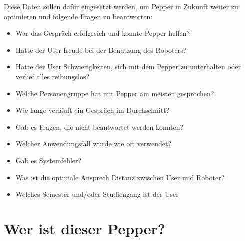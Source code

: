 Diese Daten sollen dafür eingesetzt werden, um Pepper in Zukunft weiter zu optimieren und folgende Fragen zu beantworten:
\begin{itemize}
    \item War das Gespräch erfolgreich und konnte Pepper helfen?
    \item Hatte der User freude bei der Benutzung des Roboters?
    \item Hatte der User Schwierigkeiten, sich mit dem Pepper zu unterhalten oder verlief alles reibungslos?
    \item Welche Personengruppe hat mit Pepper am meisten gesprochen?
    \item Wie lange verläuft ein Gespräch im Durchschnitt?
    \item Gab es Fragen, die nicht beantwortet werden konnten?
    \item Welcher Anwendungsfall wurde wie oft verwendet?
    \item Gab es Systemfehler?
    \item Was ist die optimale Ansprech Distanz zwischen User und Roboter?
    \item Welches Semester und/oder Studiengang ist der User
\end{itemize}

\section{Wer ist dieser Pepper?}
%
%
%
%
